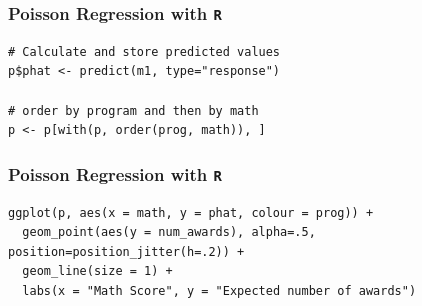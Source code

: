 \documentclass[00-GLMregslides.tex]{subfiles}
\begin{document}
\begin{frame}[fragile]

\frametitle{Poisson Regression with \texttt{R}}
\Large

\begin{framed}
\begin{verbatim}
# Calculate and store predicted values
p$phat <- predict(m1, type="response")

# order by program and then by math
p <- p[with(p, order(prog, math)), ]
\end{verbatim}
\end{framed}
\end{frame}
\begin{frame}[fragile]

\frametitle{Poisson Regression with \texttt{R}}
\large

\begin{framed}
\begin{verbatim}
ggplot(p, aes(x = math, y = phat, colour = prog)) +
  geom_point(aes(y = num_awards), alpha=.5, position=position_jitter(h=.2)) +
  geom_line(size = 1) +
  labs(x = "Math Score", y = "Expected number of awards")
\end{verbatim}
\end{framed}
\end{frame}
\end{document}
